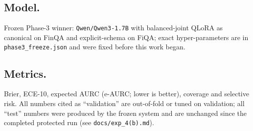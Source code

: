 \documentclass[conference]{IEEEtran}
\begin{document}
\subsection{Model.} Frozen Phase-3 winner: \texttt{Qwen/Qwen3-1.7B}
\citep{qwen2025qwen3} with balanced-joint QLoRA \citep{dettmers2023qlora} as canonical on
FinQA and explicit-schema on FiQA; exact hyper-parameters are in
\texttt{phase3\_freeze.json} and were fixed before this work began.
\subsection{Metrics.} Brier, ECE-10, expected AURC (e-AURC; lower is better), coverage and
selective risk. All numbers cited as ``validation'' are out-of-fold or tuned on
validation; all ``test'' numbers were produced by the frozen system and are unchanged since
the completed protected run (see \texttt{docs/exp\_4(b).md}).

\begin{table}[t]
\centering
\caption{Validation baseline matrix. These values are development results and are not
protected-test measurements. E8 is a secondary model-family comparison, not a controlled
architecture comparison.}
\label{tab:validation-baselines}
\small
{}
\end{table}
\end{document}

